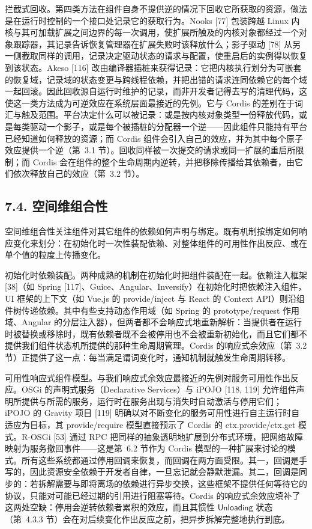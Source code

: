 拦截式回收。第四类方法在组件自身不提供逆的情况下回收它所获取的资源，做法是在运行时控制的一个接口处记录它的获取行为。Nooks {[}77{]} 包装跨越 Linux 内核与其可加载扩展之间边界的每一次调用，使扩展所触及的内核对象都经过一个对象跟踪器，其记录告诉恢复管理器在扩展失败时该释放什么；影子驱动 {[}78{]} 从另一侧截取同样的调用，记录决定驱动状态的请求与配置，使重启后的实例得以恢复到该状态。Akeso {[}116{]} 改由编译器插桩来获得记录：它把内核执行划分为可嵌套的恢复域，记录域的状态变更与跨线程依赖，并把出错的请求连同依赖它的每个域一起回滚。因此回收源自运行时维护的记录，而非开发者记得去写的清理代码，这使这一类方法成为可逆效应在系统层面最接近的先例。它与 Cordis 的差别在于词汇与触及范围。平台决定什么可以被记录：或是按内核对象类型一份释放代码，或是每类驱动一个影子，或是每个被插桩的分配器一个逆——因此组件只能持有平台已经知道如何释放的资源；而 Cordis 组件会引入自己的效应，并为其中每个原子效应提供一个逆（第~3.1 节）。回收同样被一次提交的请求或同一扩展的重启所限制；而 Cordis 会在组件的整个生命周期内逆转，并把移除传播给其依赖者，由它们依次释放自己的效应（第~3.2 节）。

\subsection{7.4. 空间维组合性}\label{spatial-composability-1}

空间维组合性关注组件对其它组件的依赖如何声明与绑定。既有机制按绑定如何响应变化来划分：在初始化时一次性装配依赖、对整体组件的可用性作出反应、或在单个值的粒度上传播变化。

初始化时依赖装配。两种成熟的机制在初始化时把组件装配在一起。依赖注入框架 {[}38{]}（如 Spring {[}117{]}、Guice、Angular、Inversify）在初始化时把依赖注入组件，UI 框架的上下文（如 Vue.js 的 provide/inject 与 React 的 Context API）则沿组件树传递依赖。其中有些支持动态作用域（如 Spring 的 prototype/request 作用域、Angular 的分层注入器），但两者都不会响应式地重新解析：当提供者在运行时被替换或移除时，既有依赖者既不会被停用也不会被重新初始化，而且它们都不提供我们组件状态机所提供的那种生命周期管理。Cordis 的响应式余效应（第~3.2 节）正提供了这一点：每当满足谓词变化时，通知机制就触发生命周期转移。

可用性响应式组件模型。与我们响应式余效应最接近的先例对服务可用性作出反应。OSGi 的声明式服务（Declarative Services）与 iPOJO {[}118, 119{]} 允许组件声明所提供与所需的服务，运行时在服务出现与消失时自动激活与停用它们；iPOJO 的 Gravity 项目 {[}119{]} 明确以对不断变化的服务可用性进行自主运行时自适应为目标，其 provide/require 模型直接预示了 Cordis 的 ctx.provide/ctx.get 模式。R-OSGi {[}53{]} 通过 RPC 把同样的抽象透明地扩展到分布式环境，把网络故障映射为服务撤回事件——这是第~6.2 节作为 Cordis 模型的一种扩展来讨论的模式。所有这些系统都通过停用回调来恢复，而回调在两方面受限。其一，回调是手写的，因此资源安全依赖于开发者自律，一旦忘记就会静默泄漏。其二，回调是同步的：若拆解需要与即将离场的依赖进行异步交换，这些框架不提供任何等待它的协议，只能对可能已经过期的引用进行阻塞等待。Cordis 的响应式余效应填补了这两处空缺：停用会逆转依赖者累积的效应，而且其惯性 \(\mathsf{Unloading}\) 状态（第~4.3.3 节）会在对后续变化作出反应之前，把异步拆解完整地执行到底。

